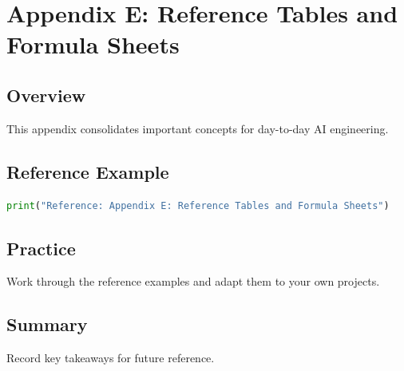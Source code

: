 \chapter{Appendix E: Reference Tables and Formula Sheets}
\label{chap:vol12-5}



\section{Overview}
This appendix consolidates important concepts for day-to-day AI engineering.

\section{Reference Example}
\begin{lstlisting}[language=Python]
print("Reference: Appendix E: Reference Tables and Formula Sheets")
\end{lstlisting}

\section{Practice}
\begin{exercise}
Work through the reference examples and adapt them to your own projects.
\end{exercise}

\section{Summary}
Record key takeaways for future reference.
